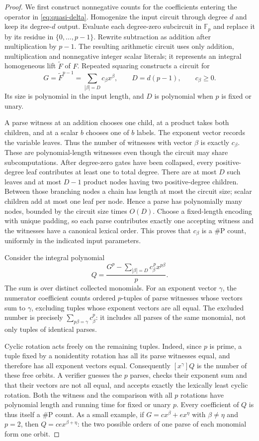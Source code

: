 \begin{proof}
We first construct nonnegative counts for the coefficients entering
the operator in \eqref{eq:quasi-delta}. Homogenize the input circuit
through degree $d$ and keep its degree-$d$ output. Evaluate each
degree-zero subcircuit in $\mathbb F_p$ and replace it by its residue
in $\{0,\ldots,p-1\}$. Rewrite subtraction as addition after
multiplication by $p-1$. The resulting arithmetic circuit uses only
addition, multiplication and nonnegative integer scalar literals;
it represents an integral homogeneous lift $\widetilde F$ of $F$.
Repeated squaring constructs a circuit for
\[
 G=\widetilde F^{p-1}=\sum_{|\beta|=D}c_\beta x^\beta,
 \qquad D=d(p-1),\qquad c_\beta\ge0.
\]
Its size is polynomial in the input length, and $D$ is polynomial
when $p$ is fixed or unary.

A parse witness at an addition chooses one child, at a product takes
both children, and at a scalar $b$ chooses one of $b$ labels. The
exponent vector records the variable leaves. Thus the number of
witnesses with vector $\beta$ is exactly $c_\beta$. These are
polynomial-length witnesses even though the circuit may share
subcomputations. After degree-zero gates have been collapsed, every
positive-degree leaf contributes at least one to total degree. There
are at most $D$ such leaves and at most $D-1$ product nodes having
two positive-degree children. Between those branching nodes a chain
has length at most the circuit size; scalar children add at most
one leaf per node. Hence a parse has polynomially many nodes,
bounded by the circuit size times $O(D)$. Choose a fixed-length
encoding with unique padding, so each parse contributes exactly one
accepting witness and the witnesses have a canonical lexical order.
This proves that $c_\beta$ is a $\#\mathrm P$ count, uniformly in
the indicated input parameters.

Consider the integral polynomial
\[
 Q=\frac{G^p-\sum_{|\beta|=D}c_\beta^{\,p}x^{p\beta}}p.
\]
The sum is over distinct collected monomials. For an exponent vector
$\gamma$, the numerator coefficient counts ordered $p$-tuples of
parse witnesses whose vectors sum to $\gamma$, excluding tuples
whose exponent vectors are all equal. The excluded number is
precisely $\sum_{p\beta=\gamma}c_\beta^p$: it includes all parses
of the same monomial, not only tuples of identical parses.

Cyclic rotation acts freely on the remaining tuples. Indeed, since
$p$ is prime, a tuple fixed by a nonidentity rotation has all its
parse witnesses equal, and therefore has all exponent vectors equal.
Consequently $[x^\gamma]Q$ is the number of these free orbits.
A verifier guesses the $p$ parses, checks their exponent sum and
that their vectors are not all equal, and accepts exactly the
lexically least cyclic rotation. Both the witness and the comparison
with all $p$ rotations have polynomial length and running time for
fixed or unary $p$. Every coefficient of $Q$ is thus itself a
$\#\mathrm P$ count. As a small example, if $G=cx^\beta+ex^\eta$
with $\beta\ne\eta$ and $p=2$, then
$Q=cex^{\beta+\eta}$: the two possible orders of one parse of
each monomial form one orbit.


\end{proof}
